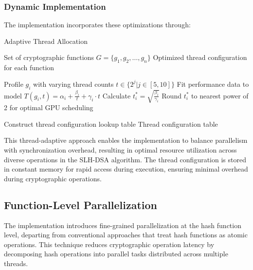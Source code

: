 \documentclass[journal]{IEEEtran}
\begin{document}

\subsubsection{Dynamic Implementation}

The implementation incorporates these optimizations through:

\begin{algorithm}
  \caption{Adaptive Thread Allocation}
  \begin{algorithmic}[1]
    \REQUIRE Set of cryptographic functions $G = \{g_1, g_2, \ldots, g_n\}$
    \ENSURE Optimized thread configuration for each function

    \STATE Profile $g_i$ with varying thread counts $t \in \{2^j | j \in [5, 10]\}$
    \STATE Fit performance data to model $T(g_i, t) = \alpha_i + \frac{\beta_i}{t} + \gamma_i \cdot t$
    \STATE Calculate $t_i^* = \sqrt{\frac{\beta_i}{\gamma_i}}$
    \STATE Round $t_i^*$ to nearest power of 2 for optimal GPU scheduling
    \ENDFOR

    \STATE Construct thread configuration lookup table
    \RETURN Thread configuration table
  \end{algorithmic}
\end{algorithm}

This thread-adaptive approach enables the implementation to balance parallelism with synchronization overhead, resulting in optimal resource utilization across diverse operations in the SLH-DSA algorithm. The thread configuration is stored in constant memory for rapid access during execution, ensuring minimal overhead during cryptographic operations.

\subsection{Function-Level Parallelization}

The implementation introduces fine-grained parallelization at the hash function level, departing from conventional approaches that treat hash functions as atomic operations. This technique reduces cryptographic operation latency by decomposing hash operations into parallel tasks distributed across multiple threads.
\end{document}
